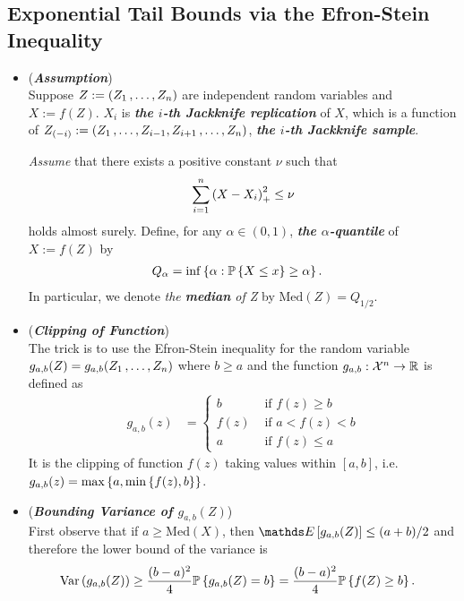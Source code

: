 \documentclass[11pt]{article}
\begin{document}
\subsection{Exponential Tail Bounds via the Efron-Stein Inequality}
\begin{itemize}
\item \begin{remark} (\textbf{\emph{Assumption}}) \citep{boucheron2013concentration}\\
Suppose $Z := (Z_1 \,{,}\ldots{,}\, Z_n)$ are independent random variables and $X := f(Z)$. $X_i$ is \emph{\textbf{the $i$-th Jackknife replication}} of $X$, which is a function of $Z_{(-i)} := (Z_1 \,{,}\ldots{,}\, Z_{i-1}, Z_{i+1} \,{,}\ldots{,}\, Z_{n})$, \emph{\textbf{the $i$-th Jackknife sample}}. 

\emph{Assume} that there exists a positive constant $\nu$ such that  
\begin{align}
\sum_{i=1}^{n}\left(X - X_i\right)_{+}^2 \le \nu  \label{ineqn: tail_bound_efron_stein_assumption}
\end{align} holds almost surely. Define, for any $\alpha \in (0, 1)$, \emph{\textbf{the $\alpha$-quantile}} of $X := f(Z)$ by
\begin{align*}
Q_{\alpha} &= \inf\left\{\alpha: {\mathbb P}\left\{X \le x\right\} \ge \alpha\right\}.
\end{align*}
In particular, we denote \emph{the \textbf{median} of Z} by $\text{Med}(Z) = Q_{1/2}$.
\end{remark}

\item \begin{remark} (\emph{\textbf{Clipping of Function}})\\
The trick is to use the Efron-Stein inequality for the random variable $g_{a,b}(Z) = g_{a,b}(Z_1 \,{,}\ldots{,}\, Z_n)$ where $b \ge a$ and the function $g_{a,b}: {\mathcal X}^n \to {\mathbb R}$ is defined as
\begin{align*}
g_{a,b}(z) &=\left\{\begin{array}{cc}
b    & \text{ if }f(z) \ge b\\
f(z) & \text{ if }a < f(z) < b\\
a    & \text{ if }f(z) \le a
\end{array}
\right. 
\end{align*} It is the clipping of function $f(z)$ taking values within $[a, b]$, i.e. $g_{a, b}(z) = \max\left\{a, \min\left\{f(z), b\right\}\right\}$. 
\end{remark}

\item \begin{remark}  (\emph{\textbf{Bounding Variance of $g_{a,b}(Z)$}})\\
First observe that if $a \ge \text{Med}(X)$, then $\E{}{g_{a, b}(Z)}\le (a + b)/2$ and therefore the lower bound of the variance is 
\begin{align*}
\text{Var}\left(g_{a,b}(Z)\right) &\ge \frac{(b-a)^2}{4}{\mathbb P}\left\{g_{a,b}(Z) = b\right\} = \frac{(b-a)^2}{4}{\mathbb P}\left\{f(Z) \ge b\right\}.
\end{align*}


\end{remark}
\end{itemize}
\end{document}
